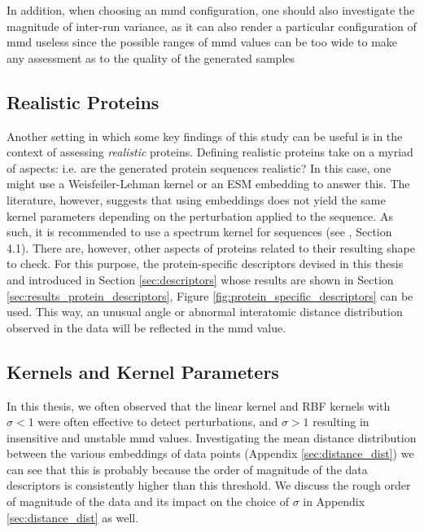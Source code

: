 In addition, when choosing an \acrshort{mmd} configuration, one should also investigate the
magnitude of inter-run variance, as it can also render a particular
configuration of \acrshort{mmd} useless since the possible ranges of \acrshort{mmd} values can be too
wide to make any assessment as to the quality of the generated samples

\subsection{Realistic Proteins}\label{sec:discussion_realistic_proteins}

Another setting in which some key findings of this study can be useful is in the
context of assessing \emph{realistic} proteins. Defining realistic proteins take on a
myriad of aspects: i.e. are the generated protein sequences realistic? In this
case, one might use a Weisfeiler-Lehman kernel or an ESM embedding to answer
this. The literature, however, suggests that using embeddings does not yield the
same kernel parameters depending on the perturbation applied to the sequence. As
such, it is recommended to use a spectrum kernel \citep{leslie2002spectrum} for
sequences (see \cite{kucera2022conditional}, Section 4.1). There are, however,
other aspects of proteins related to their resulting shape to check. For this
purpose, the protein-specific descriptors devised in this thesis and introduced in
Section \ref{sec:descriptors} whose results are shown in Section
\ref{sec:results_protein_descriptors}, Figure
\ref{fig:protein_specific_descriptors} can be used. This way, an unusual angle
or abnormal interatomic distance distribution observed in the data will be
reflected in the \acrshort{mmd} value.

\subsection{Kernels and Kernel Parameters}
In this thesis, we often observed that the linear kernel and RBF kernels with
$\sigma<1$ were often effective to detect perturbations, and $\sigma>1$
resulting in insensitive and unstable \acrshort{mmd} values. Investigating the mean
distance distribution between the various embeddings of data points (Appendix
\ref{sec:distance_dist}) we can see that this is probably because the order of
magnitude of the data descriptors is consistently higher than this threshold. We
discuss the rough order of magnitude of the data and its impact on the choice of
$\sigma$ in Appendix \ref{sec:distance_dist} as well.

